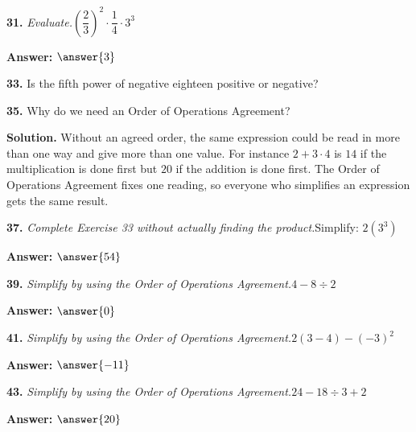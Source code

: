 \documentclass{ximera}
\begin{document}
\begin{problem}
\textbf{31.} \emph{Evaluate.}\quad $\left(\dfrac{2}{3}\right)^{2} \cdot \dfrac{1}{4} \cdot 3^3$

\textbf{Answer:} $\answer{3}$
\end{problem}

\begin{problem}
\textbf{33.} Is the fifth power of negative eighteen positive or negative?

\begin{multipleChoice}
\end{multipleChoice}
\end{problem}

\begin{problem}
\textbf{35.} Why do we need an Order of Operations Agreement?

\begin{hint}
\textbf{Solution.} Without an agreed order, the same expression could be read in more than one way and give more than one value. For instance $2+3\cdot 4$ is $14$ if the multiplication is done first but $20$ if the addition is done first. The Order of Operations Agreement fixes one reading, so everyone who simplifies an expression gets the same result.
\end{hint}
\end{problem}

\begin{problem}
\textbf{37.} \emph{Complete Exercise 33 without actually finding the product.}\quad Simplify: $2\left(3^3\right)$

\textbf{Answer:} $\answer{54}$
\end{problem}

\begin{problem}
\textbf{39.} \emph{Simplify by using the Order of Operations Agreement.}\quad $4 - 8 \div 2$

\textbf{Answer:} $\answer{0}$
\end{problem}

\begin{problem}
\textbf{41.} \emph{Simplify by using the Order of Operations Agreement.}\quad $2(3 - 4) - (-3)^2$

\textbf{Answer:} $\answer{-11}$
\end{problem}

\begin{problem}
\textbf{43.} \emph{Simplify by using the Order of Operations Agreement.}\quad $24 - 18 \div 3 + 2$

\textbf{Answer:} $\answer{20}$
\end{problem}
\end{document}
